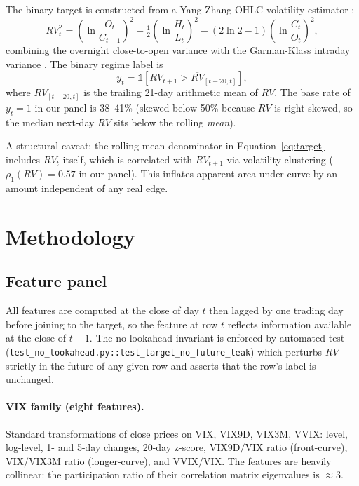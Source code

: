 \documentclass[11pt,a4paper]{article}
\begin{document}
The binary target is constructed from a Yang-Zhang OHLC volatility estimator \cite{yangzhang2000}:
\begin{equation}
    RV_t^2 = \left(\ln \frac{O_t}{C_{t-1}}\right)^2 + \tfrac{1}{2}\left(\ln \frac{H_t}{L_t}\right)^2 - (2 \ln 2 - 1)\left(\ln \frac{C_t}{O_t}\right)^2,
\end{equation}
combining the overnight close-to-open variance with the Garman-Klass intraday variance \cite{garmanklass1980}. The binary regime label is
\begin{equation}
    y_t = \mathbb{1}\!\left[RV_{t+1} > \overline{RV}_{[t-20, t]}\right],
    \label{eq:target}
\end{equation}
where $\overline{RV}_{[t-20, t]}$ is the trailing 21-day arithmetic mean of $RV$. The base rate of $y_t = 1$ in our panel is 38--41\% (skewed below 50\% because $RV$ is right-skewed, so the median next-day $RV$ sits below the rolling \emph{mean}).

A structural caveat: the rolling-mean denominator in Equation~\ref{eq:target} includes $RV_t$ itself, which is correlated with $RV_{t+1}$ via volatility clustering ($\rho_1(RV) = 0.57$ in our panel). This inflates apparent area-under-curve by an amount independent of any real edge.

\section{Methodology}

\subsection{Feature panel}

All features are computed at the close of day $t$ then lagged by one trading day before joining to the target, so the feature at row $t$ reflects information available at the close of $t-1$. The no-lookahead invariant is enforced by automated test (\verb|test_no_lookahead.py::test_target_no_future_leak|) which perturbs $RV$ strictly in the future of any given row and asserts that the row's label is unchanged.

\paragraph{VIX family (eight features).} Standard transformations of close prices on VIX, VIX9D, VIX3M, VVIX: level, log-level, 1- and 5-day changes, 20-day z-score, $\text{VIX9D}/\text{VIX}$ ratio (front-curve), $\text{VIX}/\text{VIX3M}$ ratio (longer-curve), and $\text{VVIX}/\text{VIX}$. The features are heavily collinear: the participation ratio of their correlation matrix eigenvalues is $\approx 3$.
\end{document}
